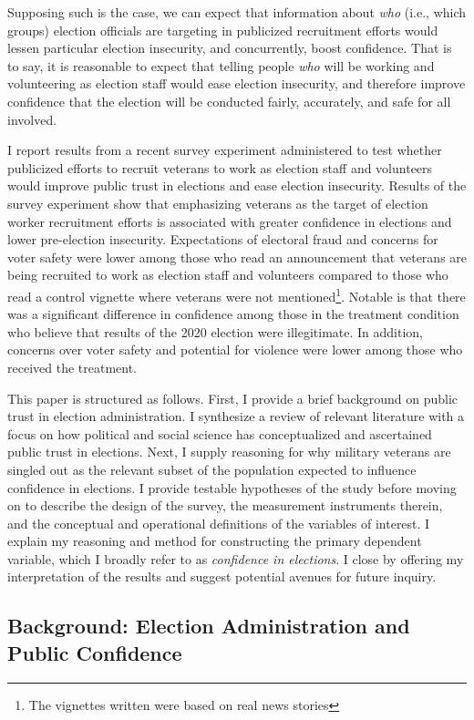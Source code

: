 \documentclass[
  12pt,
  letterpaper,
]{article}
\begin{document}
Supposing such is the case, we can expect that information about
\emph{who} (i.e., which groups) election officials are targeting in
publicized recruitment efforts would lessen particular election
insecurity, and concurrently, boost confidence. That is to say, it is
reasonable to expect that telling people \emph{who} will be working and
volunteering as election staff would ease election insecurity, and
therefore improve confidence that the election will be conducted fairly,
accurately, and safe for all involved.

I report results from a recent survey experiment administered to test
whether publicized efforts to recruit veterans to work as election staff
and volunteers would improve public trust in elections and ease election
insecurity. Results of the survey experiment show that emphasizing
veterans as the target of election worker recruitment efforts is
associated with greater confidence in elections and lower pre-election
insecurity. Expectations of electoral fraud and concerns for voter
safety were lower among those who read an announcement that veterans are
being recruited to work as election staff and volunteers compared to
those who read a control vignette where veterans were not
mentioned\footnote{The vignettes written were based on real news stories}.
Notable is that there was a significant difference in confidence among
those in the treatment condition who believe that results of the 2020
election were illegitimate. In addition, concerns over voter safety and
potential for violence were lower among those who received the
treatment.

This paper is structured as follows. First, I provide a brief background
on public trust in election administration. I synthesize a review of
relevant literature with a focus on how political and social science has
conceptualized and ascertained public trust in elections. Next, I supply
reasoning for why military veterans are singled out as the relevant
subset of the population expected to influence confidence in elections.
I provide testable hypotheses of the study before moving on to describe
the design of the survey, the measurement instruments therein, and the
conceptual and operational definitions of the variables of interest. I
explain my reasoning and method for constructing the primary dependent
variable, which I broadly refer to as \emph{confidence in elections}. I
close by offering my interpretation of the results and suggest potential
avenues for future inquiry.

\subsection{Background: Election Administration and Public
Confidence}\label{background-election-administration-and-public-confidence}
\end{document}
